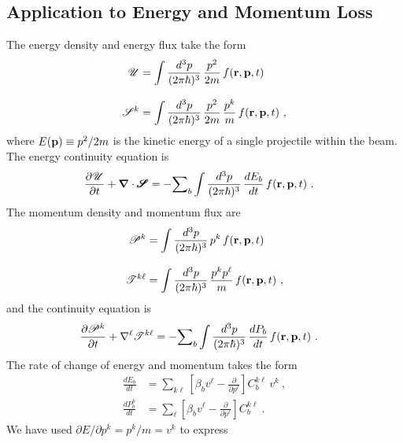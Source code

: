 \documentclass[preprint,12pt,eqsecnum,nofootinbib,amsmath,amssymb]{revtex4}
\begin{document}
\subsection{Application to Energy and Momentum Loss}

The energy density and energy flux take the form
\begin{align}
  {\mathscr U}
  &=
  \int \frac{d^3 p}{(2\pi\hbar)^3}\, \frac{p^2}{2m} \, f({\bf r}, {\bf p}, t)
  \label{eq_E}
  \\[8pt]
  {\mathscr S}^k
  &=
   \int \frac{d^3 p}{(2\pi\hbar)^3}\, \frac{p^2}{2m}\, \frac{p^k}{m}\, 
   f({\bf r}, {\bf p}, t)
   \label{eq_Eflux}
  \ ,
\end{align}
where $E({\bf p}) \equiv   p^2/2m $ is the kinetic energy of 
a single projectile within the beam. The energy continuity 
equation is
\begin{align}
  \frac{\partial {\mathscr U}}{\partial t}
  +
  {\bm\nabla} \cdot \pmb{\mathscr{S}}
  &=
  -{\sum}_b \int \frac{d^3 p}{(2\pi\hbar)^3} \,
  \frac{d E_b}{dt} \, f({\bf r}, {\bf p}, t)
  \ .
  \label{eq_q_continuity}
\end{align}
The momentum density and momentum flux are
\begin{align}
  {\mathscr P}^k
  &=
  \int \frac{d^3 p}{(2\pi\hbar)^3}\, p^k\, f({\bf r}, {\bf p}, t)
  \label{eq_P}
  \\[8pt]
  {\mathscr T}^{k\ell}
  &=
   \int \frac{d^3 p}{(2\pi\hbar)^3}\, \frac{p^k p^\ell}{m}\, 
   f({\bf r}, {\bf p}, t)
   \label{eq_Pflux}
  \ ,
\end{align}
and the continuity equation is
\begin{align}
  \frac{\partial {\mathscr P^k}}{\partial t}
  +
  {\nabla}^\ell  {\mathscr{T}^{k\ell}}
  &=
  -{\sum}_b \int \frac{d^3 p}{(2\pi\hbar)^3} \,
  \frac{d P_b}{dt} \, f({\bf r}, {\bf p}, t)
  \ .
  \label{eq_P_continuity}
\end{align}
The rate of change of energy and momentum takes the form
\begin{align}
  \frac{d E_b}{dt}
  &=
  {\sum}_{k\ell}
  \left[ \beta_b v^\ell - \frac{\partial}{\partial p^\ell}\right]
  C_b^{k \ell }\,v^k
  \ ,
  \label{eq_E_dEdt}
  \\[11pt]
  \frac{d P^k_b}{dt}
  &=
  {\sum}_{\ell}
  \left[ \beta_b v^\ell - \frac{\partial}{\partial p^\ell}\right]
  C_b^{k \ell }
  \ .
  \label{eq_P_dEdt}
\end{align}
We have used $\partial E/\partial p^k = p^k/m = v^k$ to express  
\end{document}

